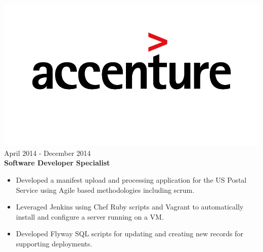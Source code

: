 \documentclass[12pt, line, margin]{res}
\begin{document}
\begin{resume}
	      {\sl  \includegraphics[scale=0.1, trim=110 200 110 120]{resume_images/accenture-logo.jpg}} \hfill April 2014 - December 2014 \\
                \textbf{Software Developer Specialist}
                 \begin{itemize}  \itemsep -2pt %
                \item   Developed a manifest upload and processing application for
                               the US Postal Service using Agile based methodologies including scrum.
                \item   Leveraged Jenkins using Chef Ruby scripts and Vagrant\newline
                               to automatically install and configure a server running on a VM.
	      \item   Developed Flyway SQL scripts for updating and creating new 
                               records for supporting deployments.
                \end{itemize}


\end{resume}
\end{document}
